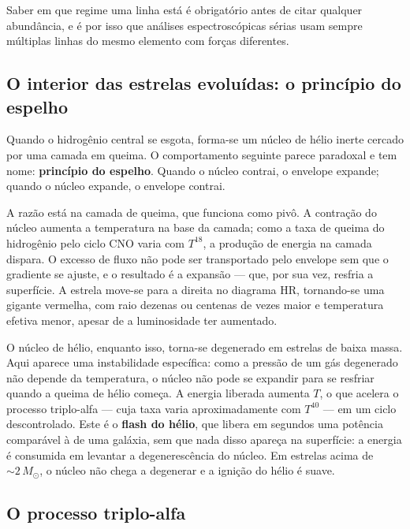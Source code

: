\documentclass[11pt,a4paper]{article}
\begin{document}
Saber em que regime uma linha está é obrigatório antes de citar qualquer abundância, e é por isso que análises espectroscópicas sérias usam sempre múltiplas linhas do mesmo elemento com forças diferentes.

\subsection*{O interior das estrelas evoluídas: o princípio do espelho}

Quando o hidrogênio central se esgota, forma-se um núcleo de hélio inerte cercado por uma camada em queima. O comportamento seguinte parece paradoxal e tem nome: \textbf{princípio do espelho}. Quando o núcleo contrai, o envelope expande; quando o núcleo expande, o envelope contrai.

A razão está na camada de queima, que funciona como pivô. A contração do núcleo aumenta a temperatura na base da camada; como a taxa de queima do hidrogênio pelo ciclo CNO varia com $T^{18}$, a produção de energia na camada dispara. O excesso de fluxo não pode ser transportado pelo envelope sem que o gradiente se ajuste, e o resultado é a expansão --- que, por sua vez, resfria a superfície. A estrela move-se para a direita no diagrama HR, tornando-se uma gigante vermelha, com raio dezenas ou centenas de vezes maior e temperatura efetiva menor, apesar de a luminosidade ter aumentado.

O núcleo de hélio, enquanto isso, torna-se degenerado em estrelas de baixa massa. Aqui aparece uma instabilidade específica: como a pressão de um gás degenerado não depende da temperatura, o núcleo não pode se expandir para se resfriar quando a queima de hélio começa. A energia liberada aumenta $T$, o que acelera o processo triplo-alfa --- cuja taxa varia aproximadamente com $T^{40}$ --- em um ciclo descontrolado. Este é o \textbf{flash do hélio}, que libera em segundos uma potência comparável à de uma galáxia, sem que nada disso apareça na superfície: a energia é consumida em levantar a degenerescência do núcleo. Em estrelas acima de $\sim2\,M_\odot$, o núcleo não chega a degenerar e a ignição do hélio é suave.

\subsection*{O processo triplo-alfa}
\end{document}
